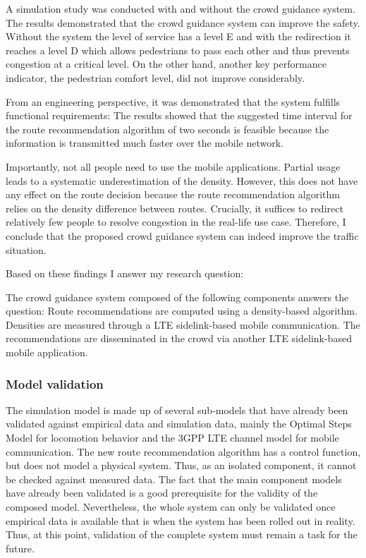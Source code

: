 A simulation study was conducted with and without the crowd guidance system. 
The results demonstrated that the crowd guidance system can improve the safety. Without the system the level of service has a level E and with the redirection it reaches a level D which allows pedestrians to pass each other and thus prevents congestion at a critical level. 
On the other hand, another key performance indicator, the pedestrian comfort level, did not improve considerably.

From an engineering perspective, it was demonstrated that the system fulfills functional requirements:
The results showed that the suggested time interval for the route recommendation algorithm of two seconds is feasible because the information is transmitted much faster over the mobile network. 


Importantly, not all people need to use the mobile applications. Partial usage leads to a systematic underestimation of the density. However, this does not have any effect on the route decision because the route recommendation algorithm relies on the density difference between routes. Crucially, it suffices to redirect relatively few people to resolve congestion in the real-life use case. Therefore, I conclude that the proposed crowd guidance system can indeed improve the traffic situation. 

\newpage

Based on these findings I answer my research question:



\begin{tcolorbox}[title=How can crowds be redirected through mobile applications based on direct communication technologies? (RQ)]
The crowd guidance system composed of the following components answers the question: Route recommendations are computed using a density-based algorithm. Densities are measured through a LTE sidelink-based mobile communication. The recommendations are disseminated in the crowd via another LTE sidelink-based mobile application.
\end{tcolorbox}


\subsubsection{Model validation}

The simulation model is made up of several sub-models that have already been validated against empirical data and simulation data, mainly the Optimal Steps Model for locomotion behavior and the 3GPP LTE channel model for mobile communication. The new route recommendation algorithm has a control function, but does not model a physical system. Thus, as an isolated component, it cannot be checked against measured data. The fact that the main component models have already been validated is a good prerequisite for the validity of the composed model. Nevertheless, the whole system can only be validated once empirical data is available that is when the system has been rolled out in reality. Thus, at this point, validation of the complete system must remain a task for the future.



